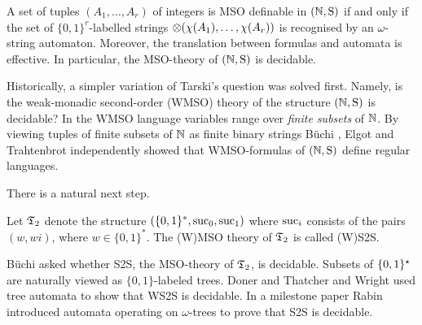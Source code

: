 \begin{theorem}
A set of tuples $(A_1,\dots,A_r)$ of integers is MSO definable in $\mbox{$(\mathbb{N},\mathrm{S})$}$ if and only if the set of $\{0,1\}^r$-labelled strings
$\otimes(\chi(A_1),\dots,\chi(A_r))$ is recognised by an $\omega$-string automaton. Moreover, the translation between formulas and automata is effective. In particular, the MSO-theory of $\mbox{$(\mathbb{N},\mathrm{S})$}$ is decidable.
\end{theorem}

Historically, a simpler variation of Tarski's question was solved first. Namely, is the weak-monadic second-order (WMSO) theory of the structure $\mbox{$(\mathbb{N},\mathrm{S})$}$ is decidable? In the WMSO language variables range over {\em finite subsets} of $\mathbb{N}$. By viewing tuples of finite subsets of $\mathbb{N}$ as finite binary strings B\"uchi \cite{Buch60}, Elgot \cite{Elgo61} and Trahtenbrot \cite{trah62} independently showed that WMSO-formulas of $\mbox{$(\mathbb{N},\mathrm{S})$}$ define regular languages. 

There is a natural next step.

\begin{definition}
Let $\mathfrak{T}_2$ denote the structure $(\{0,1\}^\ast,\text{suc}_0, \text{suc}_1)$ where $\text{suc}_i$ consists of the pairs $(w,wi)$, where $w \in \{0,1\}^\ast$. 
The (W)MSO theory of $\mathfrak{T}_2$ is called (W)S2S. 
\end{definition}
B\"uchi \cite{Buch62} asked whether S2S, the MSO-theory of $\mathfrak{T}_2$, is decidable. Subsets of $\{0,1\}^\star$ are naturally viewed as $\{0,1\}$-labeled trees.
Doner \cite{Done70} and Thatcher and Wright \cite{ThWr68} used tree automata to show that WS2S is decidable. In a milestone paper Rabin \cite{Rabi69} introduced automata operating on $\omega$-trees to prove that S2S is decidable. 

